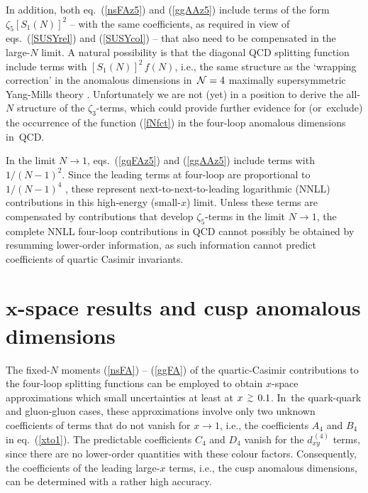 \documentclass[12pt]{article}
\newcommand{\gsim}{\raisebox{-0.7mm}{$\:\:\stackrel{>}{{\scriptstyle
 \sim}}\:\: $} }
\newcommand{\ra}{\rightarrow}
\def\zr#1{{\zeta_{#1}^{}}}
\begin{document}
In addition, both eq.~(\ref{nsFAz5}) and (\ref{ggAAz5}) include terms of
the form $\zr5 [S_1(N)]^2$
-- with the same coefficients, as required in view of eqs.~(\ref{SUSYrel})
and (\ref{SUSYcol}) -- that also need to be compensated in the large-$N$
limit. A natural possibility is that the diagonal QCD splitting
function include terms with $[S_1(N)]^2\, f(N)$, i.e., the same structure as 
the `wrapping correction' in the anomalous dimensions in $\,{\cal N}=4$ 
maximally supersymmetric Yang-Mills theory \cite{N=4wrap}.
Unfortunately we are not (yet) in a position to derive the all-$N$ structure
of the $\zr3$-terms, which could provide further evidence for (or~exclude) 
the occurrence of the function (\ref{fNfct}) in the four-loop anomalous 
dimensions in~QCD.

In the limit $N\!\ra\! 1$, eqs.~(\ref{gqFAz5}) and (\ref{ggAAz5}) include terms
with $1/(N-1)^2$. Since the leading terms at four-loop are proportional to
$1/(N-1)^4$ \cite{BFKL2}, these represent next-to-next-to-leading logarithmic
(NNLL) contributions in this high-energy (small-$x$) limit.
Unless these terms are compensated by contributions that develop $\zr5$-terms
in the limit $N \!\ra\! 1$, the complete NNLL four-loop contributions in QCD 
cannot possibly be obtained by resumming lower-order information, as such 
information cannot predict coefficients of quartic Casimir invariants.

%
\setcounter{equation}{0}
\section{$\bm x$-space results and cusp anomalous dimensions}
\label{sec:cusp}
\vspace*{-1mm}

The fixed-$N$ moments (\ref{nsFA}) -- (\ref{ggFA}) of the quartic-Casimir
contributions to the four-loop splitting functions can be employed to obtain 
$x$-space approximations which small uncertainties at least at $x \gsim 0.1$. 
In~the quark-quark and gluon-gluon cases, 
these approximations involve only two unknown coefficients of terms that do 
not vanish for $x \ra 1$, i.e., the coefficients $A_4$ and $B_4$ in 
eq.~(\ref{xto1}). The predictable coefficients $C_4$ and $D_4$ vanish for the 
$d^{\,(4)}_{xy}$ terms, since there are no lower-order quantities with these
colour factors. Consequently, the coefficients of the leading large-$x$ terms, 
i.e., the cusp anomalous dimensions, can be determined with a rather high 
accuracy.
\end{document}
